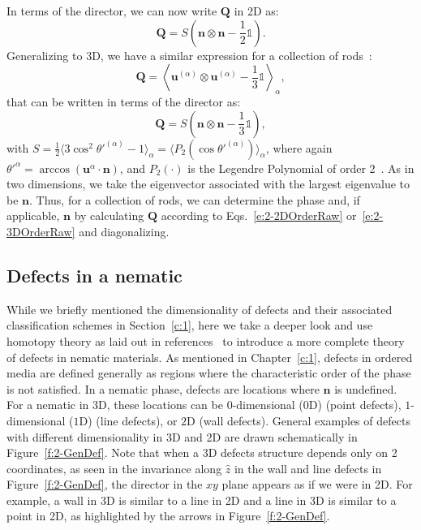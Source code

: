 In terms of the director, we can now write $\mathbf{Q}$ in 2D as:
\begin{equation}
  \mathbf{Q} = S \left ( \mathbf{n} \otimes \mathbf{n} - \frac{1}{2}\mathbb{1} \right ).\label{e:2-2DOrderDiag}
\end{equation}
Generalizing to 3D, we have a similar expression for a collection of rods~\cite{RN33}:
\begin{equation}
  \mathbf{Q} =  \left \langle \mathbf{u}^{(\alpha)} \otimes \mathbf{u}^{(\alpha)} - \frac{1}{3} \mathbb{1} \right \rangle_{\alpha},\label{e:2-3DOrderRaw}
\end{equation}
that can be written in terms of the director as:
\begin{equation}
  \mathbf{Q} = S \left ( \mathbf{n} \otimes \mathbf{n} - \frac{1}{3}\mathbb{1} \right ),\label{e:2-3DOrderDiag}
\end{equation}
with $S = \frac{1}{2} \big \langle 3 \cos^2 \theta'^{(\alpha)}  - 1 \big  \rangle_{\alpha} = \big \langle P_2(\cos \theta'^{(\alpha)}) \big \rangle_{\alpha} $,
where again $\theta'^{\alpha} = \arccos (\mathbf{u}^{\alpha} \cdot \mathbf{n})$, and $P_2(\cdot)$ is the Legendre Polynomial of order 2~\cite{RN33,RN175}.
As in two dimensions, we take the eigenvector associated with the largest eigenvalue to be $\mathbf{n}$.
Thus, for a collection of rods, we can determine the phase and, if applicable, $\mathbf{n}$ by calculating $\mathbf{Q}$ according to Eqs.~\ref{e:2-2DOrderRaw} or~\ref{e:2-3DOrderRaw} and diagonalizing.


\subsection{Defects in a nematic}\label{c:2-defects}
While we briefly mentioned the dimensionality of defects and their associated classification schemes in Section~\ref{c:1}, here we take a deeper look and use homotopy theory as laid out in references~\cite{RN196,RN236,RN153} to introduce a more complete theory of defects in nematic materials.
As mentioned in Chapter~\ref{c:1}, defects in ordered media are defined generally as regions where the characteristic order of the phase is not satisfied.
In a nematic phase, defects are locations where $\mathbf{n}$ is undefined.
For a nematic in 3D, these locations can be $0$-dimensional ($0$D) (point defects), $1$-dimensional ($1$D) (line defects), or $2$D (wall defects).
General examples of defects with different dimensionality in 3D and 2D are drawn schematically in Figure~\ref{f:2-GenDef}.
Note that when a 3D defects structure depends only on 2 coordinates, as seen in the invariance along $\hat{z}$ in the wall and line defects in Figure~\ref{f:2-GenDef}, the director in the $xy$ plane appears as if we were in 2D.
For example, a wall in 3D is similar to a line in 2D and a line in 3D is similar to a point in 2D, as highlighted by the arrows in Figure~\ref{f:2-GenDef}.

